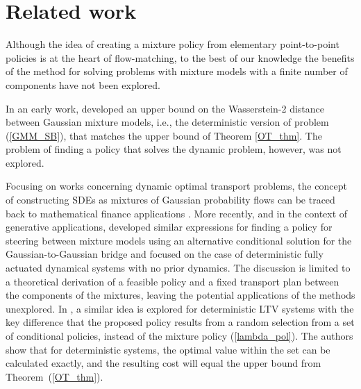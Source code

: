 \documentclass[twoside]{article}
\renewcommand{\eqref}[1]{(\ref{#1})}
\begin{document}
\section{Related work}
Although the idea of creating a mixture policy from elementary point-to-point policies is at the heart of flow-matching, to the best of our knowledge the benefits of the method for solving problems with mixture models with a finite number of components have not been explored. 

In an early work, \cite{chen2016optimal} 
developed an upper bound on the Wasserstein-2 distance between Gaussian mixture models, i.e., the deterministic version of problem \eqref{GMM_SB}, that matches the upper bound of Theorem \ref{OT_thm}.
The problem of finding a policy that solves the dynamic problem, however, was not explored.

Focusing on works concerning dynamic optimal transport problems, the concept of constructing SDEs as mixtures of Gaussian probability flows can be traced back to mathematical finance applications \citep{brigo2002general, brigo2002lognormal}.
%
More recently, and in the context of generative applications, \cite{albergo2023building} developed 
similar expressions for finding a policy for steering between mixture models using an alternative conditional solution for the Gaussian-to-Gaussian bridge and focused on the case of deterministic fully actuated dynamical systems with no prior dynamics.
%
The discussion is limited to a theoretical derivation of a feasible policy and a fixed transport plan between the components of the mixtures, leaving the potential applications of the methods unexplored. In \citep{balci2023density}, a similar idea is explored for deterministic LTV systems with the key difference that the proposed policy results from a random selection from a set of conditional policies, instead of the mixture policy \eqref{lambda_pol}.
The authors show that for deterministic systems, the optimal value within the set can be calculated exactly, and the resulting cost will equal the upper bound from 
Theorem~\eqref{OT_thm}. 
\end{document}
